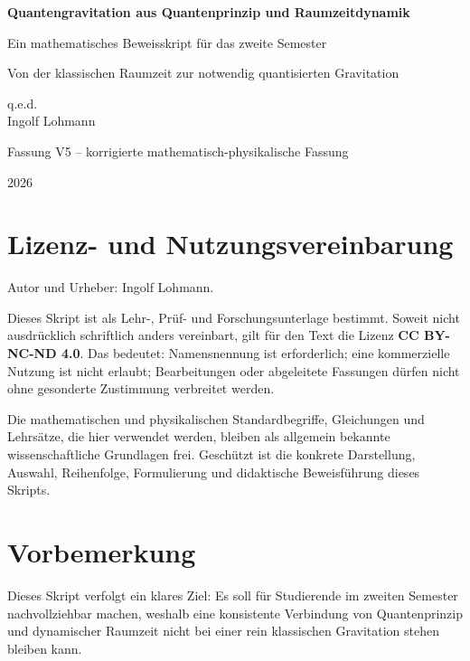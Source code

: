 \documentclass[11pt,a4paper,oneside]{book}
\theoremstyle{definition}
\theoremstyle{plain}
\theoremstyle{remark}
\begin{document}
\frontmatter
\begin{titlepage}
\centering
\vspace*{18mm}
{\Huge\bfseries Quantengravitation aus Quantenprinzip und Raumzeitdynamik\par}
\vspace{5mm}
{\Large Ein mathematisches Beweisskript für das zweite Semester\par}
\vspace{13mm}
{\large Von der klassischen Raumzeit zur notwendig quantisierten Gravitation\par}
\vfill
{\large q.e.d.\\Ingolf Lohmann\par}
\vspace{12mm}
{\large Fassung V5 -- korrigierte mathematisch-physikalische Fassung\par}
\vspace{6mm}
{\large 2026\par}
\end{titlepage}

\chapter*{Lizenz- und Nutzungsvereinbarung}
Autor und Urheber: Ingolf Lohmann.

Dieses Skript ist als Lehr-, Prüf- und Forschungsunterlage bestimmt. Soweit nicht ausdrücklich schriftlich anders vereinbart, gilt für den Text die Lizenz \textbf{CC BY-NC-ND 4.0}. Das bedeutet: Namensnennung ist erforderlich; eine kommerzielle Nutzung ist nicht erlaubt; Bearbeitungen oder abgeleitete Fassungen dürfen nicht ohne gesonderte Zustimmung verbreitet werden.

Die mathematischen und physikalischen Standardbegriffe, Gleichungen und Lehrsätze, die hier verwendet werden, bleiben als allgemein bekannte wissenschaftliche Grundlagen frei. Geschützt ist die konkrete Darstellung, Auswahl, Reihenfolge, Formulierung und didaktische Beweisführung dieses Skripts.

\chapter*{Vorbemerkung}
Dieses Skript verfolgt ein klares Ziel: Es soll für Studierende im zweiten Semester nachvollziehbar machen, weshalb eine konsistente Verbindung von Quantenprinzip und dynamischer Raumzeit nicht bei einer rein klassischen Gravitation stehen bleiben kann.
\end{document}

